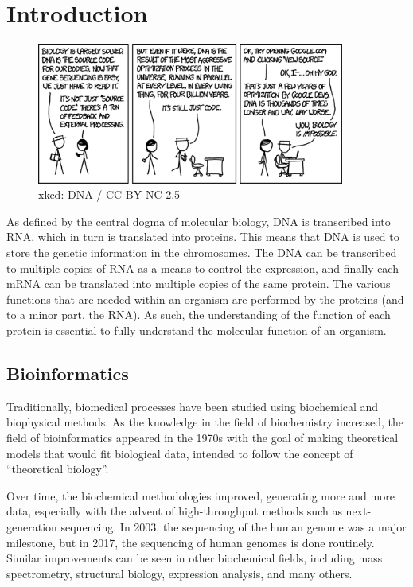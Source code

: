 \documentclass[a4paper, twoside, 12pt, openright]{report}
\begin{document}
\chapter{Introduction}


\begin{figure}[h]
 \includegraphics[width=0.9\textwidth]{fig/xkcd_dna.png}
 \caption{xkcd: DNA\cite{munroe_xkcd_2017} / \href{https://creativecommons.org/licenses/by-nc/2.5/}{CC BY-NC 2.5}}
\end{figure}

As defined by the central dogma of molecular biology\cite{crick_central_1970}, DNA is transcribed into RNA, which in turn is translated into proteins. This means that DNA is used to store the genetic information in the chromosomes. The DNA can be transcribed to multiple copies of RNA as a means to control the expression, and finally each mRNA can be translated into multiple copies of the same protein. The various functions that are needed within an organism are performed by the proteins (and to a minor part, the RNA). As such, the understanding of the function of each protein is essential to fully understand the molecular function of an organism.


\section{Bioinformatics}

Traditionally, biomedical processes have been studied using biochemical and biophysical methods. As the knowledge in the field of biochemistry increased, the field of bioinformatics appeared in the 1970s with the goal of making theoretical models that would fit biological data, intended to follow the concept of ``theoretical biology''\cite{hogeweg_roots_2011}.

Over time, the biochemical methodologies improved, generating more and more data, especially with the advent of high-throughput methods such as next-generation sequencing. In 2003, the sequencing of the human genome was a major milestone\cite{the_international_human_genome_sequencing_consortium_international_2003}, but in 2017, the sequencing of human genomes is done routinely. Similar improvements can be seen in other biochemical fields, including mass spectrometry, structural biology, expression analysis, and many others.
\end{document}
